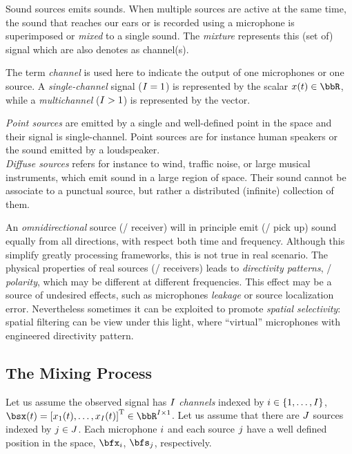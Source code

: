 Sound sources emits sounds.
When multiple sources are active at the same time, the sound that reaches our ears or is recorded using a microphone is superimposed or \textit{mixed} to a single sound.
The \textit{mixture} represents this (set of) signal which are also denotes as channel(s).

The term \textit{channel}
 is used here to indicate the output of one microphones or one source.
A \textit{single-channel} signal ($I = 1$) is represented by the scalar $\mic(t) \in \R$,
while a \textit{multichannel} ($I >   1$) is represented by the vector.

\textit{Point sources} are emitted by a single and well-defined point in the space and their signal is single-channel.
Point sources are for instance human speakers or the sound emitted by a loudspeaker.
\\\textit{Diffuse sources} refers for instance to wind, traffic noise, or large musical instruments, which emit sound in a large region of space.
Their sound cannot be associate to a punctual source, but rather a distributed (infinite) collection of them.

An \textit{omnidirectional} source (\resp/ receiver) will in principle emit (\resp/ pick up) sound equally from all directions,
with respect both time and frequency.
Although this simplify greatly processing frameworks, this is not true in real scenario.
The physical properties of real sources (\resp/ receivers) leads to \textit{directivity patterns}, \aka/ \textit{polarity}, which may
be different at different frequencies.
This effect may be a source of undesired effects, such as microphones \textit{leakage} or source localization error.
Nevertheless sometimes it can be exploited to promote \textit{spatial selectivity}:
spatial filtering can be view under this light, where ``virtual'' microphones with engineered directivity pattern.

\subsection{The Mixing Process}
Let us assume the observed signal has $I$ \textit{channels} indexed by $\idxMic \in \kbrace{1,\dots,\numMics}$,
$\mics(t) = \ktranspose{\klist{\mic_1(t), \dots, \mic_{\numMics}(t)}} \in \R^{\numMics \times 1}$.
Let us assume that there are $J$ sources indexed by $j \in J$.
Each microphone $i$ and each source $j$ have a well defined position in the space, $\positionMicrophone_\idxMic$, $\positionSource_\idxSrc$, respectively.

